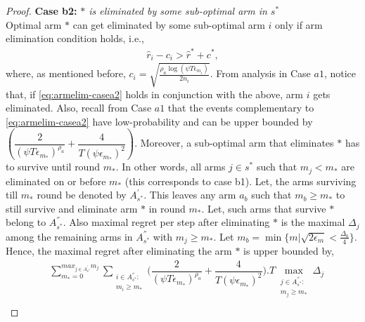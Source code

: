 \begin{proof}
 
\textbf{Case b2:} \textit{${*}$ is eliminated by some sub-optimal arm in $s^*$} \\
Optimal arm $*$ can get eliminated by some sub-optimal arm $i$ only if arm elimination condition holds, i.e., 
\begin{align*}
\hat r_{i} - c_{i} > \hat{r}^{*}+ c^{*},
\end{align*}
where, as mentioned before, $c_{i}  =\sqrt{\frac{\rho_{a}\log (\psi T\epsilon_{m_{i}})}{2 n_{i}}}$.
From analysis in Case $a1$, notice that, if \eqref{eq:armelim-casea2} holds in conjunction with the above, arm $i$ gets eliminated. Also, recall from Case $a1$ that the events complementary to \eqref{eq:armelim-casea2} have low-probability and can be upper bounded by $\left(\dfrac{2}{(\psi  T\epsilon_{m_{*}})^{\rho_{a}}} + \dfrac{4}{T(\psi\epsilon_{m_{*}})^2}\right)$. Moreover, a sub-optimal arm that eliminates $*$ has to survive until round $m_*$. In other words, all arms ${j}\in s^{*}$ such that $m_{j} < m_{*}$ are eliminated on or before $m_*$ (this corresponds to case b1). Let, the arms surviving till $m_{*}$ round be denoted by $A^{'}_{s^{*}}$. This leaves any arm $a_{b}$ such that $m_{b}\geq m_{*} $ to still survive and eliminate arm ${*}$ in round $m_{*}$. Let, such arms that survive ${*}$ belong to $A^{''}_{s^{*}}$. Also maximal regret per step after eliminating ${*}$ is the maximal $\Delta_{j}$ among the remaining arms in $A^{''}_{s^{*}}$ with $m_{j}\geq m_{*}$.  Let $m_{b}=\min\lbrace m|\sqrt{2\epsilon_{m}}<\frac{\Delta_{b}}{4}\rbrace$. Hence, the maximal regret after eliminating the arm ${*}$ is upper bounded by, 
\begin{align*}
&\sum_{m_{*}=0}^{max_{j\in A^{'}_{s^{*}}}m_{j}}\sum_{\substack{i\in A^{''}_{s^{*}}: \\ m_{i}\geq m_{*}}}\bigg(\dfrac{2}{(\psi  T\epsilon_{m_{*}})^{\rho_{a}}} + \dfrac{4}{T(\psi\epsilon_{m_{*}})^2}\bigg).T\max_{\substack{j\in A^{''}_{s^{*}}: \\ m_{j}\geq m_{*}}}{\Delta}_{j}\\

\end{align*}
\end{proof}
